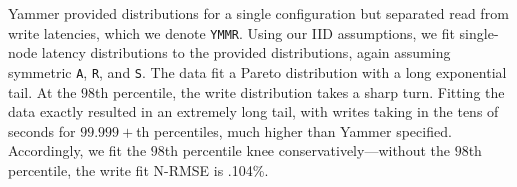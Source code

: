 \documentclass{vldb}
\begin{document}
Yammer provided distributions for a single configuration but separated
read from write latencies, which we denote \texttt{YMMR}.  Using our
IID assumptions, we fit single-node latency distributions to the
provided distributions, again assuming symmetric \texttt{A},
\texttt{R}, and \texttt{S}.  The data fit a Pareto distribution with a
long exponential tail.  At the $98$th percentile, the write
distribution takes a sharp turn.  Fitting the data exactly resulted in
an extremely long tail, with writes taking in the tens of seconds for
$99.999+$th percentiles, much higher than Yammer specified.
Accordingly, we fit the $98$th percentile knee
conservatively---without the $98$th percentile, the write fit N-RMSE
is .104\%.


\begin{figure}[t!]
\centering
{}\\[-1mm]

\end{figure}
\end{document}
